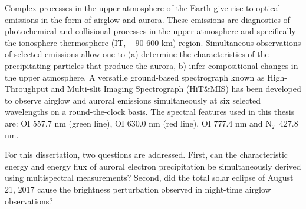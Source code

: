
Complex processes in the upper atmosphere of the Earth give rise to optical emissions in the form of airglow and aurora. These emissions are diagnostics of photochemical and collisional processes in the upper-atmosphere and specifically the ionosphere-thermosphere (IT, ~ 90-600 km) region. Simultaneous observations of selected emissions allow one to (a) determine the characteristics of the precipitating particles that produce the aurora, b) infer compositional changes in the upper atmosphere. A versatile ground-based spectrograph known as High-Throughput and Multi-slit Imaging Spectrograph (HiT\&MIS) has been developed to observe airglow and auroral emissions simultaneously at six selected wavelengths on a round-the-clock basis. The spectral features used in this thesis are: OI 557.7 nm (green line), OI 630.0 nm (red line), OI 777.4 nm and N$_2^+$ 427.8 nm.  

 

For this dissertation, two questions are addressed. First, can the characteristic energy and energy flux of auroral electron precipitation be simultaneously derived using multispectral measurements? Second, did the total solar eclipse of August 21, 2017 cause the brightness perturbation observed in night-time airglow observations? 

